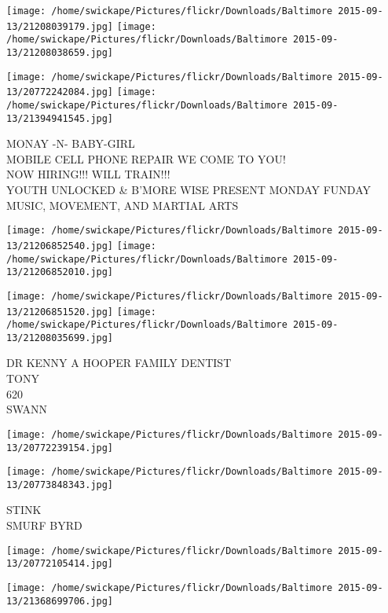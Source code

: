 \documentclass[10pt,letterpaper]{article}
\begin{document}
\texttt{[image: /home/swickape/Pictures/flickr/Downloads/Baltimore 2015-09-13/21208039179.jpg]}
\texttt{[image: /home/swickape/Pictures/flickr/Downloads/Baltimore 2015-09-13/21208038659.jpg]}

\texttt{[image: /home/swickape/Pictures/flickr/Downloads/Baltimore 2015-09-13/20772242084.jpg]}
\texttt{[image: /home/swickape/Pictures/flickr/Downloads/Baltimore 2015-09-13/21394941545.jpg]}

MONAY {-}N{-} BABY{-}GIRL\\
MOBILE CELL PHONE REPAIR WE COME TO YOU!\\
NOW HIRING!!! WILL TRAIN!!!\\
YOUTH UNLOCKED \& B'MORE WISE PRESENT MONDAY FUNDAY MUSIC, MOVEMENT, AND MARTIAL ARTS\\
\pagebreak

\texttt{[image: /home/swickape/Pictures/flickr/Downloads/Baltimore 2015-09-13/21206852540.jpg]}
\texttt{[image: /home/swickape/Pictures/flickr/Downloads/Baltimore 2015-09-13/21206852010.jpg]}

\texttt{[image: /home/swickape/Pictures/flickr/Downloads/Baltimore 2015-09-13/21206851520.jpg]}
\texttt{[image: /home/swickape/Pictures/flickr/Downloads/Baltimore 2015-09-13/21208035699.jpg]}

DR KENNY A HOOPER FAMILY DENTIST\\
TONY\\
620\\
SWANN\\
\pagebreak

\texttt{[image: /home/swickape/Pictures/flickr/Downloads/Baltimore 2015-09-13/20772239154.jpg]}

\vspace{0.25in}
\texttt{[image: /home/swickape/Pictures/flickr/Downloads/Baltimore 2015-09-13/20773848343.jpg]}

STINK\\
SMURF BYRD\\
\pagebreak

\texttt{[image: /home/swickape/Pictures/flickr/Downloads/Baltimore 2015-09-13/20772105414.jpg]}

\vspace{0.25in}
\texttt{[image: /home/swickape/Pictures/flickr/Downloads/Baltimore 2015-09-13/21368699706.jpg]}
\end{document}
